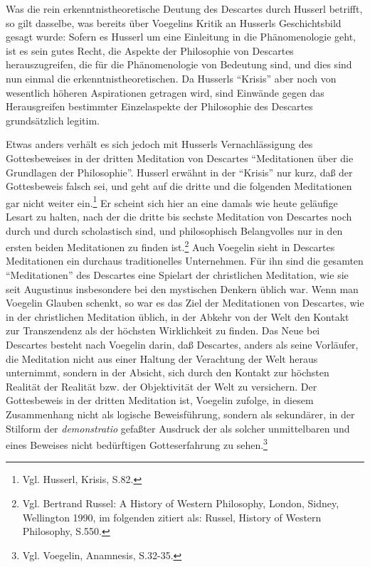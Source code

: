 Was die rein erkenntnistheoretische Deutung des Descartes durch Husserl
betrifft, so gilt dasselbe, was bereits über Voegelins Kritik an Husserls
Geschichtsbild gesagt wurde: Sofern es Husserl um eine Einleitung in die
Phänomenologie geht, ist es sein gutes Recht, die Aspekte der Philosophie von
Descartes herauszugreifen, die für die Phänomenologie von Bedeutung sind, und
dies sind nun einmal die erkenntnistheoretischen. Da Husserls "`Krisis"' aber
noch von wesentlich höheren Aspirationen getragen wird, sind Einwände gegen
das Herausgreifen bestimmter Einzelaspekte der Philosophie des Descartes
grundsätzlich legitim.

Etwas anders verhält es sich jedoch mit Husserls Vernachlässigung des
Gottesbeweises in der dritten Meditation von Descartes "`Meditationen über die
Grundlagen der Philosophie"'. Husserl erwähnt in der "`Krisis"' nur kurz, daß
der Gottesbeweis falsch sei, und geht auf die dritte und die folgenden
Meditationen gar nicht weiter ein.\footnote{Vgl. Husserl, Krisis, S.82.}  Er
scheint sich hier an eine damals wie heute geläufige Lesart zu halten, nach
der die dritte bis sechste Meditation von Descartes noch durch und durch
scholastisch sind, und philosophisch Belangvolles nur in den ersten beiden
Meditationen zu finden ist.\footnote{Vgl. Bertrand Russel: A History of
  Western Philosophy, London, Sidney, Wellington 1990, im folgenden zitiert
  als: Russel, History of Western Philosophy, S.550.} Auch Voegelin sieht in
Descartes Meditationen ein durchaus traditionelles Unternehmen. Für ihn sind
die gesamten "`Meditationen"' des Descartes eine Spielart der christlichen
Meditation, wie sie seit Augustinus insbesondere bei den mystischen Denkern
üblich war. Wenn man Voegelin Glauben schenkt, so war es das Ziel der
Meditationen von Descartes, wie in der christlichen Meditation üblich, in der
Abkehr von der Welt den Kontakt zur Transzendenz als der höchsten Wirklichkeit
zu finden. Das Neue bei Descartes besteht nach Voegelin darin, daß Descartes,
anders als seine Vorläufer, die Meditation nicht aus einer Haltung der
Verachtung der Welt heraus unternimmt, sondern in der Absicht, sich durch den
Kontakt zur höchsten Realität der Realität bzw.  der Objektivität der Welt zu
versichern. Der Gottesbeweis in der dritten Meditation ist, Voegelin zufolge,
in diesem Zusammenhang nicht als logische Beweisführung, sondern als
sekundärer, in der Stilform der {\it demonstratio} gefaßter Ausdruck der als
solcher unmittelbaren und eines Beweises nicht bedürftigen Gotteserfahrung zu
sehen.\footnote{Vgl. Voegelin, Anamnesis, S.32-35.}

